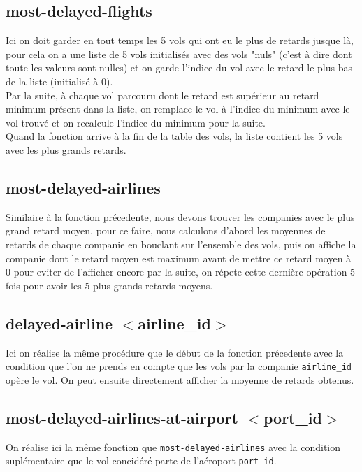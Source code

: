 \documentclass[a4paper, 12pt]{article}
\begin{document}
	\subsection{most-delayed-flights}
	Ici on doit garder en tout temps les 5 vols qui ont eu le plus de retards jusque là, pour cela on a une liste de 5 vols initialisés avec des vols "nuls" (c'est à dire dont toute les valeurs sont nulles) et on garde l'indice du vol avec le retard le plus bas de la liste (initialisé à 0).\\
	Par la suite, à chaque vol parcouru dont le retard est supérieur au retard minimum présent dans la liste, on remplace le vol à l'indice du minimum avec le vol trouvé et on recalcule l'indice du minimum pour la suite.\\
	Quand la fonction arrive à la fin de la table des vols, la liste contient les 5 vols avec les plus grands retards.\\
	
	\subsection{most-delayed-airlines}
	Similaire à la fonction précedente, nous devons trouver les companies avec le plus grand retard moyen, pour ce faire, nous calculons d'abord les moyennes de retards de chaque companie en bouclant sur l'ensemble des vols, puis on affiche la companie dont le retard moyen est maximum avant de mettre ce retard moyen à 0 pour eviter de l'afficher encore par la suite, on répete cette dernière opération 5 fois pour avoir les 5 plus grands retards moyens.\\
	
	\subsection{\texorpdfstring{delayed-airline $<$airline\_id$>$}{}}
	Ici on réalise la même procédure que le début de la fonction précedente avec la condition que l'on ne prends en compte que les vols par la companie \lstinline|airline_id| opère le vol. On peut ensuite directement afficher la moyenne de retards obtenus.\\
	
	\subsection{\texorpdfstring{most-delayed-airlines-at-airport $<$port\_id$>$}{}}
	On réalise ici la même fonction que \lstinline|most-delayed-airlines| avec la condition suplémentaire que le vol concidéré parte de l'aéroport \lstinline|port_id|.\\
	
\end{document}
